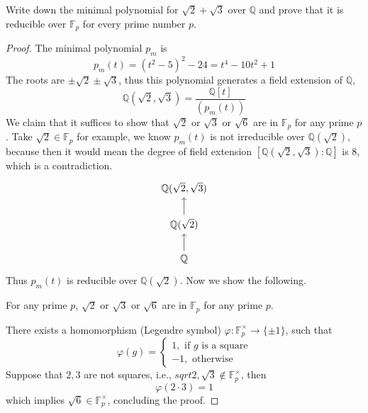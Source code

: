 \documentclass[openany]{book}
\newcommand{\F}{\mathbb{F}}
\newcommand{\Q}{\mathbb{Q}}
\begin{document}
\begin{prob}
    Write down the minimal polynomial for \(\sqrt{2}+\sqrt{3}\) over \(\mathbb{Q}\) and prove that it is reducible over \(\mathbb{F}_{p}\) for every prime number \(p\).
\end{prob}
\begin{proof}
    The minimal polynomial $p_m$ is 
    \begin{equation*}
        p_m(t)=(t^2-5)^2-24=t^4-10t^2+1
    \end{equation*}
    The roots are $\pm\sqrt{2}\pm\sqrt{3}$, thus this polynomial generates a field extension of $\Q$, 
    \begin{equation*}
        \Q(\sqrt{2},\sqrt{3})=\frac{\Q[t]}{(p_m(t))}
    \end{equation*}
    We claim that it suffices to show that $\sqrt{2}$ or $\sqrt{3}$ or $\sqrt{6}$ are in $\F_p$ for any prime $p$. Take $\sqrt{2}\in\F_p$ for example, we know $p_m(t)$ is not irreducible over $\Q(\sqrt{2})$, because then it would mean the degree of field extension $[\Q(\sqrt{2},\sqrt{3}): \Q]$ is 8, which is a contradiction.
    \[\begin{tikzcd}
        {\mathbb{Q}(\sqrt{2},\sqrt{3})} \\
        {\mathbb{Q}(\sqrt{2})} \\
        {\mathbb{Q}}
        \arrow[from=2-1, to=1-1]
        \arrow[from=3-1, to=2-1]
    \end{tikzcd}\]
    Thus $p_m(t)$ is reducible over $\Q(\sqrt{2})$. Now we show the following.
    \begin{lem}
        For any prime $p$, $\sqrt{2}$ or $\sqrt{3}$ or $\sqrt{6}$ are in $\F_p$ for any prime $p$.
    \end{lem}
    There exists a homomorphism (Legendre symbol) $\varphi:\F_p^\times\to \{\pm 1\}$, such that 
    \begin{equation*}
        \varphi(g)=\begin{cases}
            1, \text{ if $g$ is a square}\\
            -1, \text{ otherwise}
        \end{cases}
    \end{equation*}
    Suppose that $2,3$ are not squares, i.e., $sqrt{2},\sqrt{3}\not\in\F_p^\times$, then 
    \begin{equation*}
        \varphi(2\cdot 3)=1
    \end{equation*}
    which implies $\sqrt{6}\in\F_p^\times$, concluding the proof.
\end{proof}
\end{document}

